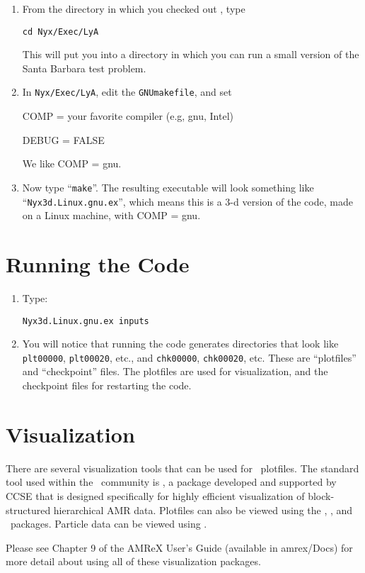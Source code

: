\begin{enumerate}

\item From the directory in which you checked out \nyx, type
\begin{verbatim}
cd Nyx/Exec/LyA
\end{verbatim}
This will put you into a directory in which you can run a small
version of the Santa Barbara test problem.

\item In {\tt Nyx/Exec/LyA}, edit the {\tt GNUmakefile}, and set

COMP = your favorite compiler (e.g, gnu, Intel)

DEBUG = FALSE

We like COMP = gnu.

\item Now type ``{\tt make}''. The resulting executable will look something like 
``{\tt Nyx3d.Linux.gnu.ex}'', which means this is a 3-d version of the code, 
made on a Linux machine, with COMP = gnu.

\end{enumerate}

\section{Running the Code}

\begin{enumerate}

\item Type:
\begin{verbatim}
Nyx3d.Linux.gnu.ex inputs
\end{verbatim}

\item You will notice that running the code generates directories that look like 
{\tt plt00000}, {\tt plt00020}, etc.,
and {\tt chk00000}, {\tt chk00020}, etc. These are ``plotfiles'' and  
``checkpoint'' files. The plotfiles are used for visualization,
and the checkpoint files for restarting the code.

\end{enumerate}

\section{Visualization}

There are several visualization tools that can be used for \nyx\
plotfiles.  The standard tool used within the
\amrex\ community is \amrvis, a package developed and supported
by CCSE that is designed specifically for highly efficient visualization
of block-structured hierarchical AMR data.
Plotfiles can also be viewed using the \visit, \paraview, and \yt\ packages.
Particle data can be viewed using \paraview.

Please see Chapter 9 of the AMReX User's Guide (available in amrex/Docs)
for more detail about using all of these visualization packages.
